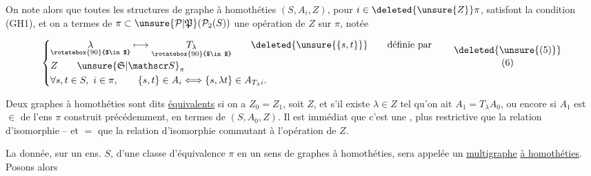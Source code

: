 
On note alors que toutes les structures de graphe à homothéties $(S,A_i,Z)$, pour $i\in\deleted{\unsure{Z}}\pi$, satisfont la condition (GH1), et on a  termes de  $\pi\subset\unsure{\mathcal P|\mathfrak P}(\mathcal P_2(S))$ une opération de $Z$ sur $\pi$, notée

\[
\left\{\begin{aligned}
 &\underset{\rotatebox{90}{$\in$}}{\lambda}\longmapsto\underset{\rotatebox{90}{$\in$}}{T_\lambda}
       \qquad \deleted{\unsure{\{s,t\}}}\qquad\text{définie par}\\[-2pt]
 &Z\qquad \unsure{\mathfrak S|\mathscr S}_\pi\\
 &\forall s,t\in S,\ i\in\pi,\qquad\{s,t\}\in A_i\Longleftrightarrow\{s,\lambda t\}\in A_{T_\lambda i}.
\end{aligned}\right.\tag*{\shortstack{\deleted{\unsure{(5)}}\\(6)}}
\]


Deux  graphes à homothéties  sont dits \uline{équivalents}    si on a $Z_0=Z_1$, soit $Z$, et s'il existe $\lambda\in Z$ tel qu'on ait $A_1=T_\lambda A_0$,  ou encore si $A_1$ est $\in$ de l'ens $\pi$ construit précédemment, en termes de $(S,A_0,Z)$. Il est immédiat que c'est  une  , plus restrictive que la relation d'isomorphie -- et $=$ que la relation d'isomorphie commutant à l'opération de $Z$.

La donnée,  sur un ens. $S$, d'une classe d'équivalence $\pi$ en un sens de graphes à homothéties, sera appelée un \uline{multigraphe} \uline{à homothéties}. Posons alors

